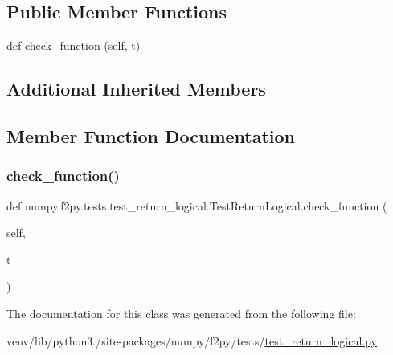 \subsection*{Public Member Functions}
\begin{DoxyCompactItemize}
\item 
def \hyperlink{classnumpy_1_1f2py_1_1tests_1_1test__return__logical_1_1TestReturnLogical_a727e381a4f8138c71002227e3abc9223}{check\+\_\+function} (self, t)
\end{DoxyCompactItemize}
\subsection*{Additional Inherited Members}


\subsection{Member Function Documentation}
\mbox{\label{classnumpy_1_1f2py_1_1tests_1_1test__return__logical_1_1TestReturnLogical_a727e381a4f8138c71002227e3abc9223}} 
\subsubsection{\texorpdfstring{check\+\_\+function()}{check\_function()}}
{\footnotesize\ttfamily def numpy.\+f2py.\+tests.\+test\+\_\+return\+\_\+logical.\+Test\+Return\+Logical.\+check\+\_\+function (\begin{DoxyParamCaption}\item[{}]{self,  }\item[{}]{t }\end{DoxyParamCaption})}



The documentation for this class was generated from the following file\+:\begin{DoxyCompactItemize}
\item 
venv/lib/python3./site-\/packages/numpy/f2py/tests/\hyperlink{test__return__logical_8py}{test\+\_\+return\+\_\+logical.\+py}\end{DoxyCompactItemize}
